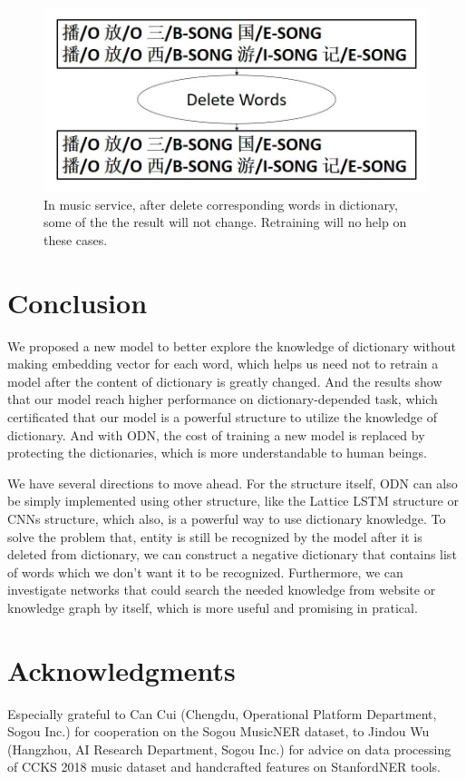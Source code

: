 \documentclass[letterpaper]{article} %
\begin{document}
\begin{figure}[t]
\centering
\includegraphics[width=0.85\columnwidth]{no_change_after_delete_song} %
\caption{In music service, after delete corresponding words in dictionary, some of the the result will not change. Retraining will no help on these cases.}
\label{fig5}
\end{figure}

\section{Conclusion}

We proposed a new model to better explore the knowledge of dictionary without making embedding vector for each word, which helps us need not to retrain a model after the content of dictionary is greatly changed. And the results show that our model reach higher performance on dictionary-depended task, which certificated that our model is a powerful structure to utilize the knowledge of dictionary. And with ODN, the cost of training a new model is replaced by protecting the dictionaries, which is more understandable to human beings.

We have several directions to move ahead. For the structure itself, ODN can also be simply implemented using other structure, like the Lattice LSTM structure or CNNs structure, which also, is a powerful way to use dictionary knowledge. To solve the problem that, entity is still be recognized by the model after it is deleted from dictionary, we can construct a negative dictionary that contains list of words which we don't want it to be recognized. Furthermore, we can investigate networks that could search the needed knowledge from website or knowledge graph by itself, which is more useful and promising in pratical.

\section{ Acknowledgments }

Especially grateful to Can Cui (Chengdu, Operational Platform Department, Sogou Inc.) for cooperation on the Sogou MusicNER dataset, to Jindou Wu (Hangzhou, AI Research Department, Sogou Inc.) for advice on data processing of CCKS 2018 music dataset and handcrafted features on StanfordNER tools.



\end{document}
